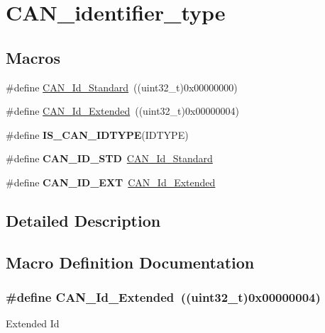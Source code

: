 \hypertarget{group___c_a_n__identifier__type}{\section{C\-A\-N\-\_\-identifier\-\_\-type}
\label{group___c_a_n__identifier__type}
}
\subsection*{Macros}
\begin{DoxyCompactItemize}
\item 
\#define \hyperlink{group___c_a_n__identifier__type_ga151d9df8a6f361d0a3231593726b5a13}{C\-A\-N\-\_\-\-Id\-\_\-\-Standard}~((uint32\-\_\-t)0x00000000)
\item 
\#define \hyperlink{group___c_a_n__identifier__type_gaf6c5c0b43b968fed17fd90246912b1a7}{C\-A\-N\-\_\-\-Id\-\_\-\-Extended}~((uint32\-\_\-t)0x00000004)
\item 
\#define {\bfseries I\-S\-\_\-\-C\-A\-N\-\_\-\-I\-D\-T\-Y\-P\-E}(I\-D\-T\-Y\-P\-E)
\item 
\hypertarget{group___c_a_n__identifier__type_ga284ca16658deb9d0c21f4ddc6db14833}{\#define {\bfseries C\-A\-N\-\_\-\-I\-D\-\_\-\-S\-T\-D}~\hyperlink{group___c_a_n__identifier__type_ga151d9df8a6f361d0a3231593726b5a13}{C\-A\-N\-\_\-\-Id\-\_\-\-Standard}}\label{group___c_a_n__identifier__type_ga284ca16658deb9d0c21f4ddc6db14833}

\item 
\hypertarget{group___c_a_n__identifier__type_ga5f6fdd1dc3d312af1ac30e2eee15d6f0}{\#define {\bfseries C\-A\-N\-\_\-\-I\-D\-\_\-\-E\-X\-T}~\hyperlink{group___c_a_n__identifier__type_gaf6c5c0b43b968fed17fd90246912b1a7}{C\-A\-N\-\_\-\-Id\-\_\-\-Extended}}\label{group___c_a_n__identifier__type_ga5f6fdd1dc3d312af1ac30e2eee15d6f0}

\end{DoxyCompactItemize}


\subsection{Detailed Description}


\subsection{Macro Definition Documentation}
\hypertarget{group___c_a_n__identifier__type_gaf6c5c0b43b968fed17fd90246912b1a7}{
\subsubsection[{C\-A\-N\-\_\-\-Id\-\_\-\-Extended}]{\setlength{\rightskip}{0pt plus 5cm}\#define C\-A\-N\-\_\-\-Id\-\_\-\-Extended~((uint32\-\_\-t)0x00000004)}}\label{group___c_a_n__identifier__type_gaf6c5c0b43b968fed17fd90246912b1a7}
Extended Id 

